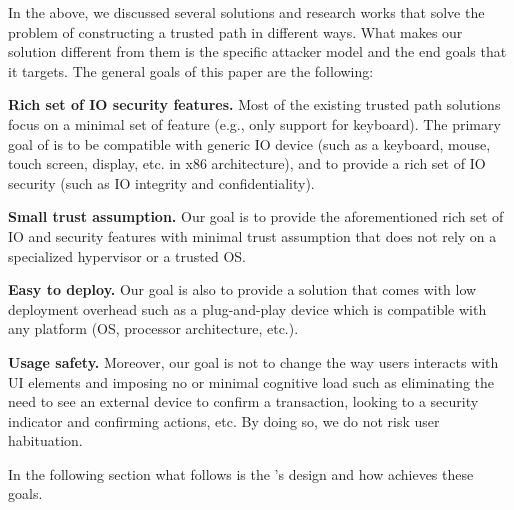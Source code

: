 In the above, we discussed several solutions and research works that solve the problem of constructing a trusted path in different ways. What makes our solution different from them is the specific attacker model and the end goals that it targets.
The general goals of this paper are the following:

\begin{mylist}
  \item  \textbf{Rich set of IO security features.} Most of the existing trusted path solutions focus on a minimal set of feature (e.g., only support for keyboard). The primary goal of \name is to be compatible with generic IO device (such as a keyboard, mouse, touch screen, display, etc. in x86 architecture), and to provide a rich set of IO security (such as IO integrity and confidentiality). 
  
  \item  \textbf{Small trust assumption.} Our goal is to provide the aforementioned rich set of IO and security features with minimal trust assumption that does not rely on a specialized hypervisor or a trusted OS. %
  
  \item \textbf{Easy to deploy.} Our goal is also to provide a solution that comes with low deployment overhead such as a plug-and-play device which is compatible with any platform (OS, processor architecture, etc.). 
  
  \item \textbf{Usage safety.} Moreover, our goal is not to change the way users interacts with UI elements and imposing no or minimal cognitive load such as eliminating the need to see an external device to confirm a transaction, looking to a security indicator and confirming actions, etc. By doing so, we do not risk user habituation. 

\end{mylist}

In the following section what follows is the \name's design and how \name achieves these goals.
